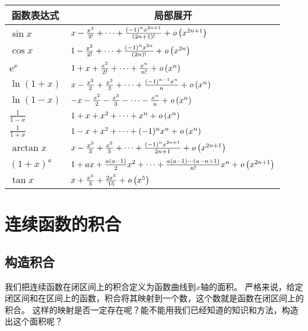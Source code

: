 \documentclass[12pt,UTF8]{ctexbook}
\begin{document}
\begin{appendix}
\begin{center}
    \renewcommand{\arraystretch}{2}
    \setlength{\extrarowheight}{-3pt}
    \begin{longtable}{|l|l|}
        \hline \multicolumn{1}{|c|}{\textbf{函数表达式}} & \multicolumn{1}{c|}{\textbf{局部展开}} \\[4pt] 
        \hline    
        $\sin{x}$ & $x - \frac{x^3}{3!} + \cdots + \frac{(-1)^n x^{2n+1}}{(2n+1)!} + \mathit{o}\left(x^{2n+1}\right) $ \\[4pt]
        \hline
        $\cos{x}$ & $1 - \frac{x^2}{2!} + \cdots + \frac{(-1)^n x^{2n}}{(2n)!} + \mathit{o}\left(x^{2n}\right) $ \\[4pt]
        \hline
        $\mathrm{e}^x$ & $1 + x + \frac{x^2}{2!} + \cdots + \frac{x^n}{n!} + \mathit{o}\left(x^n\right)$ \\[4pt]
        \hline
        $\ln{(1 + x)}$ & $x - \frac{x^2}{2} + \frac{x^3}{3} + \cdots + \frac{(-1)^{n-1}x^{n}}{n} + \mathit{o}\left(x^{n}\right)$ \\[4pt]  
        \hline
        $\ln{(1 - x)}$ & $- x - \frac{x^2}{2} - \frac{x^3}{3} - \cdots - \frac{x^{n}}{n} + \mathit{o}\left(x^{n}\right)$ \\[4pt]  
        \hline
        $\frac{1}{1 - x}$ & $1 + x + x^2 + \cdots + x^n + \mathit{o}\left(x^{n}\right)$ \\[4pt]  
        \hline
        $\frac{1}{1 + x}$ & $1 - x + x^2 + \cdots + (-1)^n x^n + \mathit{o}\left(x^{n}\right)$ \\[4pt]  
        \hline
        $\arctan{x}$ & $x - \frac{x^3}{3} + \frac{x^5}{5} + \cdots + \frac{(-1)^n x^{2n+1}}{2n+1} + \mathit{o}\left(x^{2n+1}\right)$ \\[4pt]  
        \hline
        $(1 + x)^a$ & $1 + ax + \frac{a(a - 1)}{2}x^2 + \cdots + \frac{a(a - 1)\cdots(a - n + 1)}{n!}x^n + \mathit{o}\left(x^{2n+1}\right)$ \\[4pt] 
        \hline
        $\tan{x}$ & $x + \frac{x^3}{3} + \frac{2x^5}{15} + \mathit{o}\left(x^{5}\right)$ \\[4pt]
        \hline
    \end{longtable}
\end{center}

\chapter{连续函数的积合}

\section{构造积合}

我们把连续函数在闭区间上的积合定义为函数曲线到$x$轴的面积。
严格来说，给定闭区间和在区间上的函数，积合将其映射到一个数，这个数就是函数在闭区间上的积合。
这样的映射是否一定存在呢？能不能用我们已经知道的知识和方法，构造出这个面积呢？


\end{appendix}
\end{document}
